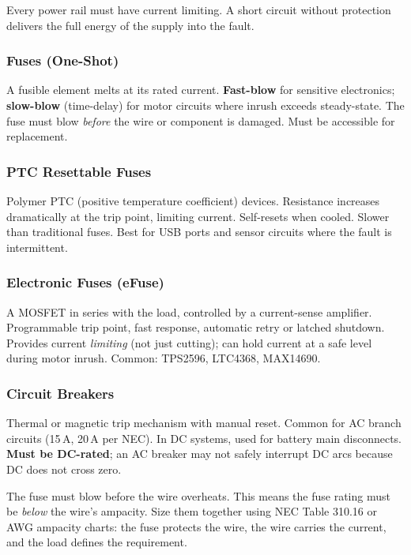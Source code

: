 \documentclass[11pt,letterpaper,twoside,openany]{book}
\begin{document}
Every power rail must have current limiting. A short circuit without protection delivers the full energy of the supply into the fault.

\subsubsection{Fuses (One-Shot)}
A fusible element melts at its rated current. \textbf{Fast-blow} for sensitive electronics; \textbf{slow-blow} (time-delay) for motor circuits where inrush exceeds steady-state. The fuse must blow \emph{before} the wire or component is damaged. Must be accessible for replacement.

\subsubsection{PTC Resettable Fuses}
Polymer PTC (positive temperature coefficient) devices. Resistance increases dramatically at the trip point, limiting current. Self-resets when cooled. Slower than traditional fuses. Best for USB ports and sensor circuits where the fault is intermittent.

\subsubsection{Electronic Fuses (eFuse)}
A MOSFET in series with the load, controlled by a current-sense amplifier. Programmable trip point, fast response, automatic retry or latched shutdown. Provides current \emph{limiting} (not just cutting); can hold current at a safe level during motor inrush. Common: TPS2596, LTC4368, MAX14690.

\subsubsection{Circuit Breakers}
Thermal or magnetic trip mechanism with manual reset. Common for AC branch circuits (15\,A, 20\,A per NEC). In DC systems, used for battery main disconnects. \textbf{Must be DC-rated}; an AC breaker may not safely interrupt DC arcs because DC does not cross zero.

\begin{warningbox}
The fuse must blow before the wire overheats. This means the fuse rating must be \emph{below} the wire's ampacity. Size them together using NEC Table 310.16 or AWG ampacity charts: the fuse protects the wire, the wire carries the current, and the load defines the requirement.
\end{warningbox}
\end{document}
